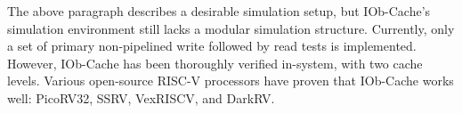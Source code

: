 %

The above paragraph describes a desirable simulation setup, but IOb-Cache's
simulation environment still lacks a modular simulation structure. Currently,
only a set of primary non-pipelined write followed by read tests is
implemented. However, IOb-Cache has been thoroughly verified in-system, with two
cache levels. Various open-source RISC-V processors have proven that IOb-Cache
works well: PicoRV32, SSRV, VexRISCV, and DarkRV.
\clearpage
